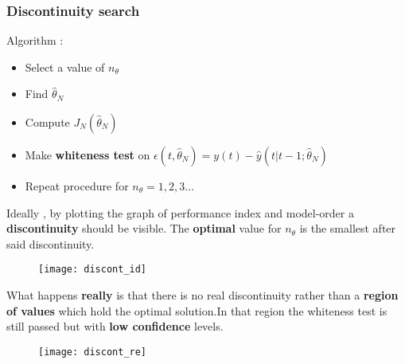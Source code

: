 \subsubsection{Discontinuity search}
Algorithm :
\begin{itemize}
\item Select a value of $n_{\theta}$
\item Find $\hat{\theta}_N$
\item Compute $J_N(\hat{\theta}_N)$
\item Make \textbf{whiteness test} on $\epsilon(t,\hat{\theta}_N)=y(t)-\hat{y}(t|t-1;\hat{\theta}_N)$
\item Repeat procedure for $n_{\theta}=1,2,3...$
\end{itemize}
Ideally , by plotting the graph of performance index and model-order a \textbf{discontinuity} should be visible. The \textbf{optimal} value for $n_{\theta}$ is the smallest after said discontinuity.
\begin{figure}[H]
 \centering
  \texttt{[image: discont\_id]}
\end{figure}
What happens \textbf{really} is that there is no real discontinuity rather than a \textbf{region of values} which hold the optimal solution.In that region the whiteness test is still passed but with \textbf{low confidence} levels.
\begin{figure}[H]
 \centering
  \texttt{[image: discont\_re]}
\end{figure}

